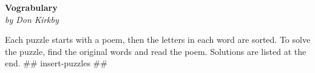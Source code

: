 \documentclass[letterpaper,10pt]{extarticle}
\begin{document}
\newcommand{\hdash}{{\fontsize{36pt}{0.1em}\selectfont \rule{0pt}{18pt}\_}}
   \begin{center}
      \Large\textbf{Vograbulary}\\
      \large\textit{by Don Kirkby}
   \end{center}
{\fontsize{3mm}{0.1em}\selectfont
Each puzzle starts with a poem, then the letters in each word are sorted. To
solve the puzzle, find the original words and read the poem. Solutions are
listed at the end.
}
## insert-puzzles ##
\end{document}
